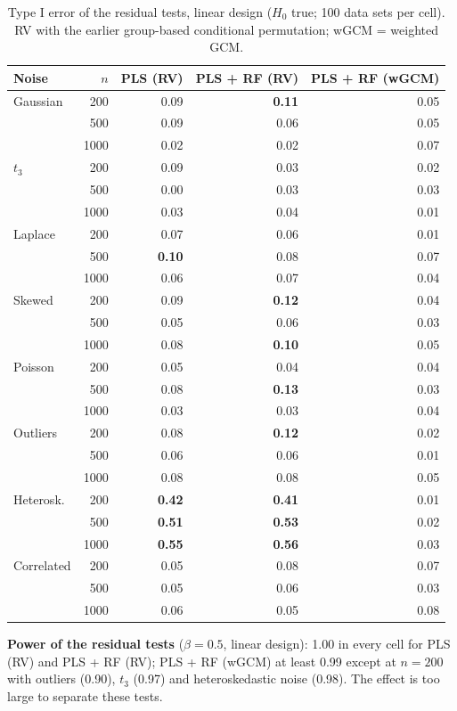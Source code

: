 \documentclass[10pt,leqno]{amsart}
\newcommand{\hi}[1]{\textbf{#1}}            %
\begin{document}
\begin{table}[H]
\caption{Type I error of the residual tests, linear design ($H_0$ true; 100 data sets per cell). RV with the earlier group-based conditional permutation; wGCM = weighted GCM.}
\label{tab:res-type1}
\footnotesize
\begin{tabular}{lrrrr}
\toprule
Noise & $n$ & PLS (RV) & PLS + RF (RV) & PLS + RF (wGCM) \\
\midrule
Gaussian & 200 & 0.09 & \hi{0.11} & 0.05 \\
 & 500 & 0.09 & 0.06 & 0.05 \\
 & 1000 & 0.02 & 0.02 & 0.07 \\
\addlinespace[1pt]
$t_3$ & 200 & 0.09 & 0.03 & 0.02 \\
 & 500 & 0.00 & 0.03 & 0.03 \\
 & 1000 & 0.03 & 0.04 & 0.01 \\
\addlinespace[1pt]
Laplace & 200 & 0.07 & 0.06 & 0.01 \\
 & 500 & \hi{0.10} & 0.08 & 0.07 \\
 & 1000 & 0.06 & 0.07 & 0.04 \\
\addlinespace[1pt]
Skewed & 200 & 0.09 & \hi{0.12} & 0.04 \\
 & 500 & 0.05 & 0.06 & 0.03 \\
 & 1000 & 0.08 & \hi{0.10} & 0.05 \\
\addlinespace[1pt]
Poisson & 200 & 0.05 & 0.04 & 0.04 \\
 & 500 & 0.08 & \hi{0.13} & 0.03 \\
 & 1000 & 0.03 & 0.03 & 0.04 \\
\addlinespace[1pt]
Outliers & 200 & 0.08 & \hi{0.12} & 0.02 \\
 & 500 & 0.06 & 0.06 & 0.01 \\
 & 1000 & 0.08 & 0.08 & 0.05 \\
\addlinespace[1pt]
Heterosk. & 200 & \hi{0.42} & \hi{0.41} & 0.01 \\
 & 500 & \hi{0.51} & \hi{0.53} & 0.02 \\
 & 1000 & \hi{0.55} & \hi{0.56} & 0.03 \\
\addlinespace[1pt]
Correlated & 200 & 0.05 & 0.08 & 0.07 \\
 & 500 & 0.05 & 0.06 & 0.03 \\
 & 1000 & 0.06 & 0.05 & 0.08 \\
\bottomrule
\end{tabular}
\end{table}

\textbf{Power of the residual tests} ($\beta=0.5$, linear design): 1.00 in every cell
for PLS (RV) and PLS + RF (RV); PLS + RF (wGCM) at least 0.99 except at $n=200$ with
outliers (0.90), $t_3$ (0.97) and heteroskedastic noise (0.98). The effect is too large
to separate these tests.
\end{document}
